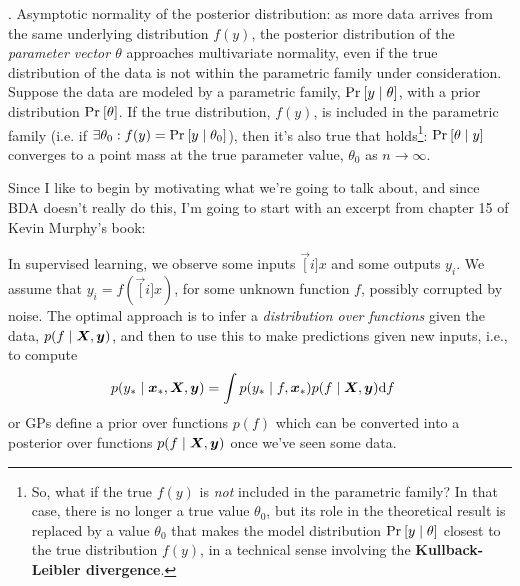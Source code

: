 \documentclass[11pt]{article}
\begin{document}
\myspace
\p {}. Asymptotic normality of the posterior distribution: as more data arrives from the same underlying distribution $f(y)$, the posterior distribution of the \textit{parameter vector $\theta$} approaches multivariate normality, even if the true distribution of the data is not within the parametric family under consideration. \\

\p Suppose the data are modeled by a parametric family, $\Prob{y \mid \theta}$, with a prior distribution $\Prob{\theta}$. If the true distribution, $f(y)$, is included in the parametric family (i.e. if $\exists \theta_0: f(y) = \Prob{y \mid \theta_0}$), then it's also true that  holds\footnote{So, what if the true $f(y)$ is \textit{not} included in the parametric family? In that case, there is no longer a true value $\theta_0$, but its role in the theoretical result is replaced by a value $\theta_0$ that makes the model distribution $\Prob{y \mid \theta}$ closest to the true distribution $f(y)$, in a technical sense involving the \textbf{Kullback-Leibler divergence}.
}: $\Prob{\theta \mid y}$ converges to a point mass at the true parameter value, $\theta_0$ as $n \rightarrow \infty$.










Since I like to begin by motivating what we're going to talk about, and since BDA doesn't really do this, I'm going to start with an excerpt from chapter 15 of Kevin Murphy's book:
\begin{definition}
	In supervised learning, we observe some inputs $\vec[i]{x}$ and some outputs $y_i$. We assume that $y_i = f(\vec[i]{x})$, for some unknown function $f$, possibly corrupted by noise. The optimal approach is to infer a \textit{distribution over functions} given the data, $p(f \mid \X, \vec y)$, and then to use this to make predictions given new inputs, i.e., to compute
	\begin{align}
		p(y_* \mid \vec[*]{x}, \X, \vec y) 
			&= \int p(y_* \mid f, \vec[*]{x}) p(f \mid \X, \vec y) \mathrm{d}f
	\end{align}
	 or GPs define a prior over functions $p(f)$ which can be converted into a posterior over functions $p(f \mid \X, \vec y)$ once we've seen some data.
\end{definition}
\end{document}
